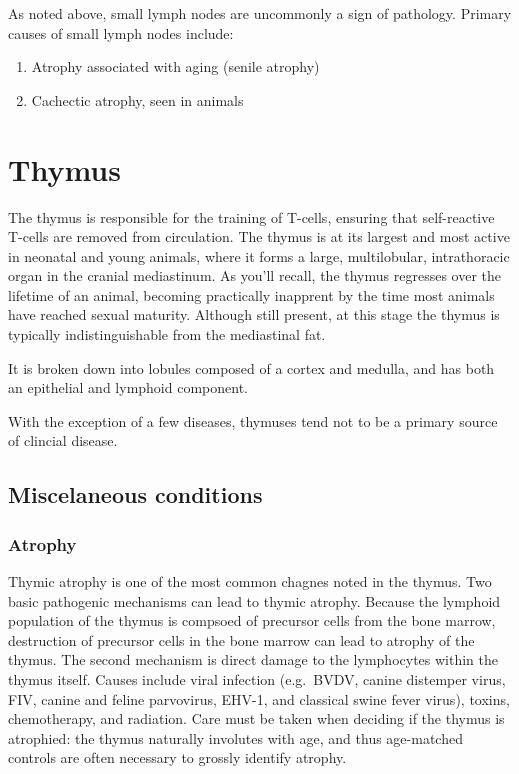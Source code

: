 \documentclass[openany]{article}
\providecommand{\tightlist}{%
  \setlength{\itemsep}{0pt}\setlength{\parskip}{0pt}}
\begin{document}
As noted above, small lymph nodes are uncommonly a sign of pathology.
Primary causes of small lymph nodes include:

\begin{enumerate}
\def\labelenumi{\arabic{enumi}.}
\tightlist
\item
  Atrophy associated with aging (senile atrophy)
\item
  Cachectic atrophy, seen in animals
\end{enumerate}

\section{Thymus}\label{thymus}

The thymus is responsible for the training of T-cells, ensuring that
self-reactive T-cells are removed from circulation. The thymus is at its
largest and most active in neonatal and young animals, where it forms a
large, multilobular, intrathoracic organ in the cranial mediastinum. As
you'll recall, the thymus regresses over the lifetime of an animal,
becoming practically inapprent by the time most animals have reached
sexual maturity. Although still present, at this stage the thymus is
typically indistinguishable from the mediastinal fat.

It is broken down into lobules composed of a cortex and medulla, and has
both an epithelial and lymphoid component.

With the exception of a few diseases, thymuses tend not to be a primary
source of clincial disease.

\subsection{Miscelaneous conditions}\label{miscelaneous-conditions}

\subsubsection{Atrophy}\label{atrophy}

Thymic atrophy is one of the most common chagnes noted in the thymus.
Two basic pathogenic mechanisms can lead to thymic atrophy. Because the
lymphoid population of the thymus is compsoed of precursor cells from
the bone marrow, destruction of precursor cells in the bone marrow can
lead to atrophy of the thymus. The second mechanism is direct damage to
the lymphocytes within the thymus itself. Causes include viral infection
(e.g.~BVDV, canine distemper virus, FIV, canine and feline parvovirus,
EHV-1, and classical swine fever virus), toxins, chemotherapy, and
radiation. Care must be taken when deciding if the thymus is atrophied:
the thymus naturally involutes with age, and thus age-matched controls
are often necessary to grossly identify atrophy.
\end{document}
